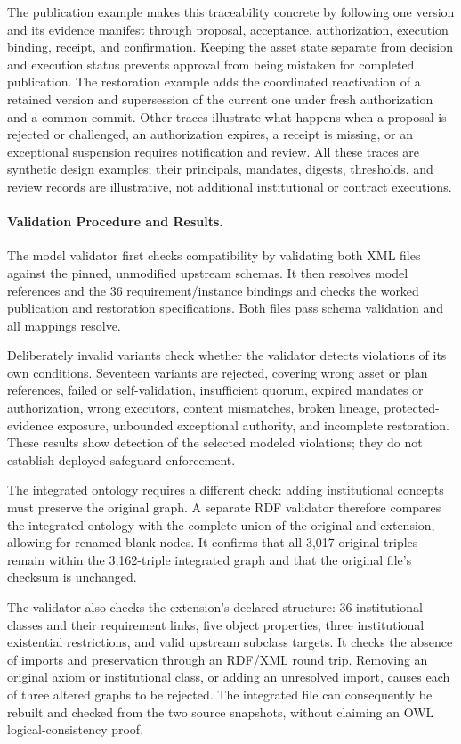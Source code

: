 \documentclass[journal]{IEEEtran}
\begin{document}
The publication example makes this traceability concrete by following
one version and its evidence manifest through proposal, acceptance,
authorization, execution binding, receipt, and confirmation. Keeping
the asset state separate from decision and execution status prevents
approval from being mistaken for completed publication. The restoration
example adds the coordinated reactivation of a retained version and
supersession of the current one under fresh authorization and a common
commit. Other traces illustrate what happens when a proposal is rejected
or challenged, an authorization expires, a receipt is missing, or an
exceptional suspension requires notification and review. All these traces
are synthetic design examples; their principals, mandates, digests,
thresholds, and review records are illustrative, not additional
institutional or contract executions.

\paragraph{Validation Procedure and Results.}

The model validator first checks compatibility by validating both XML
files against the pinned, unmodified upstream schemas. It then resolves
model references and the 36 requirement/instance bindings and checks
the worked publication and restoration specifications. Both files pass
schema validation and all mappings resolve.

Deliberately invalid variants check whether the validator detects violations
of its own conditions. Seventeen variants are rejected, covering wrong
asset or plan references, failed or self-validation, insufficient quorum,
expired mandates or authorization, wrong executors, content mismatches,
broken lineage, protected-evidence exposure, unbounded exceptional authority,
and incomplete restoration. These results show detection of the selected
modeled violations; they do not establish deployed safeguard enforcement.

The integrated ontology requires a different check: adding institutional
concepts must preserve the original graph. A separate RDF validator
therefore compares the integrated ontology with the complete union of
the original and extension, allowing for renamed blank nodes. It confirms
that all 3,017 original triples remain within the 3,162-triple integrated
graph and that the original file's checksum is unchanged.

The validator also checks the extension's declared structure: 36 institutional
classes and their requirement links, five object properties, three
institutional existential restrictions, and valid upstream subclass targets.
It checks the absence of imports and preservation through an RDF/XML round
trip. Removing an original axiom or institutional class, or adding an
unresolved import, causes each of three altered graphs to be rejected.
The integrated file can consequently be rebuilt and checked from the two
source snapshots, without claiming an OWL logical-consistency proof.
\end{document}
